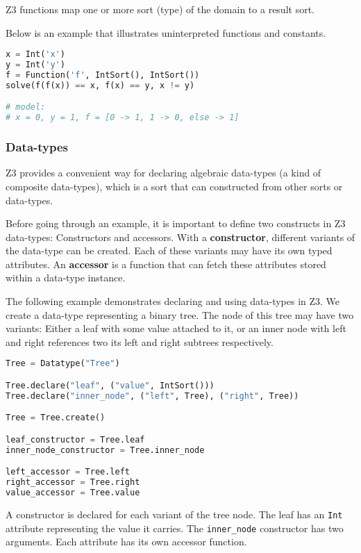 Z3 functions map one or more sort (type) of the domain to a result sort.

Below is an example that illustrates uninterpreted functions and constants.

\begin{lstlisting}[language=python]
x = Int('x')
y = Int('y')
f = Function('f', IntSort(), IntSort())
solve(f(f(x)) == x, f(x) == y, x != y)

# model:
# x = 0, y = 1, f = [0 -> 1, 1 -> 0, else -> 1]
\end{lstlisting}

\subsubsection{Data-types}
Z3 provides a convenient way for declaring algebraic data-types (a kind of composite data-types), which is a sort that can constructed from other sorts or data-types.

Before going through an example, it is important to define two constructs in Z3 data-types: Constructors and accessors. With a \textbf{constructor}, different variants of the data-type can be created. Each of these variants may have its own typed attributes. An \textbf{accessor} is a function that can fetch these attributes stored within a data-type instance.

The following example demonstrates declaring and using data-types in Z3. We create a data-type representing a binary tree. The node of this tree may have two variants: Either a leaf with some value attached to it, or an inner node with left and right references two its left and right subtrees respectively.

\begin{lstlisting}[language=python]
Tree = Datatype("Tree")

Tree.declare("leaf", ("value", IntSort()))
Tree.declare("inner_node", ("left", Tree), ("right", Tree))

Tree = Tree.create()

leaf_constructor = Tree.leaf
inner_node_constructor = Tree.inner_node

left_accessor = Tree.left
right_accessor = Tree.right
value_accessor = Tree.value
\end{lstlisting}

A constructor is declared for each variant of the tree node. The leaf has an \lstinline|Int| attribute representing the value it carries. The \lstinline|inner_node| constructor has two arguments. Each attribute has its own accessor function.

